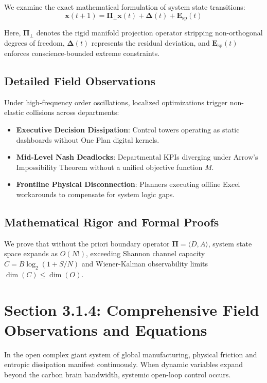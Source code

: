 \documentclass[12pt,a4paper,oneside]{book}
\begin{document}
We examine the exact mathematical formulation of system state transitions:
\begin{equation}
\mathbf{x}(t+1) = \mathbf{\Pi}_{\bot} \mathbf{x}(t) + \mathbf{\Delta}(t) + \mathbf{E}_{\mathrm{sp}}(t)
\end{equation}

Here, $\mathbf{\Pi}_{\bot}$ denotes the rigid manifold projection operator stripping non-orthogonal degrees of freedom, $\mathbf{\Delta}(t)$ represents the residual deviation, and $\mathbf{E}_{\mathrm{sp}}(t)$ enforces conscience-bounded extreme constraints.

\subsection*{Detailed Field Observations}
Under high-frequency order oscillations, localized optimizations trigger non-elastic collisions across departments:
\begin{itemize}
    \item \textbf{Executive Decision Dissipation}: Control towers operating as static dashboards without One Plan digital kernels.
    \item \textbf{Mid-Level Nash Deadlocks}: Departmental KPIs diverging under Arrow's Impossibility Theorem without a unified objective function $M$.
    \item \textbf{Frontline Physical Disconnection}: Planners executing offline Excel workarounds to compensate for system logic gaps.
\end{itemize}

\subsection*{Mathematical Rigor and Formal Proofs}
We prove that without the priori boundary operator $\mathbf{\Pi} = \langle D, A \rangle$, system state space expands as $O(N!)$, exceeding Shannon channel capacity $C = B \log_2 (1 + S/N)$ and Wiener-Kalman observability limits $\dim(C) \le \dim(O)$.
\clearpage
\section{Section 3.1.4: Comprehensive Field Observations and Equations}

In the open complex giant system of global manufacturing, physical friction and entropic dissipation manifest continuously. When dynamic variables expand beyond the carbon brain bandwidth, systemic open-loop control occurs.
\end{document}
